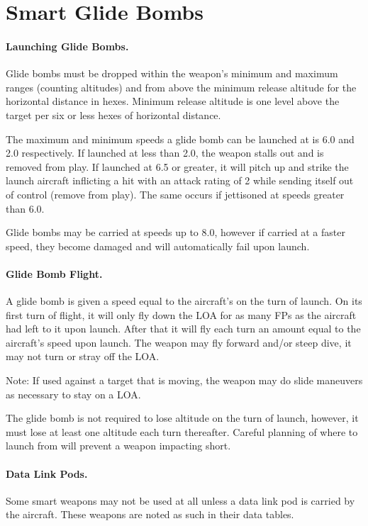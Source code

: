 \section{Smart Glide Bombs}

\paragraph{Launching Glide Bombs.} Glide bombs must be dropped within the weapon's minimum and maximum ranges (counting altitudes) and from above the minimum release altitude for the horizontal distance in hexes. Minimum release altitude is one level above the target per six or less hexes of horizontal distance.

The maximum and minimum speeds a glide bomb can be launched at is 6.0 and 2.0 respectively. If launched at less than 2.0, the weapon stalls out and is removed from play. If launched at 6.5 or greater, it will pitch up and strike the launch aircraft inflicting a hit with an attack rating of 2 while sending itself out of control (remove from play). The same occurs if jettisoned at speeds greater than 6.0.

Glide bombs may be carried at speeds up to 8.0, however if carried at a faster speed, they become damaged and will automatically fail upon launch.

\paragraph{Glide Bomb Flight.} A glide bomb is given a speed equal to the aircraft's on the turn of launch. On its first turn of flight, it will only fly down the LOA for as many FPs as the aircraft had left to it upon launch. After that it will fly each turn an amount equal to the aircraft's speed upon launch. The weapon may fly forward and/or steep dive, it may not turn or stray off the LOA.

Note: If used against a target that is moving, the weapon may do slide maneuvers as necessary to stay on a LOA.

The glide bomb is not required to lose altitude on the turn of launch, however, it must lose at least one altitude each turn thereafter. Careful planning of where to launch from will prevent a weapon impacting short.

\paragraph{Data Link Pods.} 
\label{rule:data-link-pods}
Some smart weapons may not be used at all unless a data link pod is carried by the aircraft. These weapons are noted as such in their data tables.

